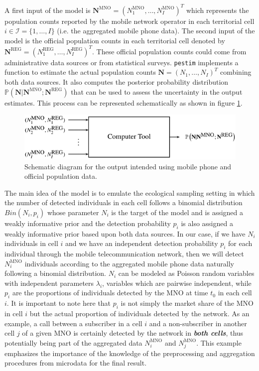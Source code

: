 \documentclass[12pt, a4paper]{article}
\begin{document}
A first input of the model is 
$\mathbf{N}^{\textrm{MNO}}=(N_{1}^{\textrm{MNO}}, \dots, N_{I}^{\textrm{MNO}})^{T}$ which 
represents the population counts reported by the mobile network operator in 
each territorial cell $i\in\mathcal{I}=\{1,\dots,I\}$ (i.e. the aggregated mobile phone data). 
The second input of the model is the official population counts in each territorial cell denoted by 
$\mathbf{N}^{\textrm{REG}}=(N_{1}^{\textrm{REG}}, \dots, N_{I}^{\textrm{REG}})^{T}$. 
These official population counts could come from administrative data sources or from statistical surveys.
\texttt{pestim} implements a function to estimate the actual population 
counts $\mathbf{N}=(N_{1}, \dots, N_{I})^{T}$ combining both data sources. 
It also computes the posterior probability distribution 
$\mathbb{P}\left(\mathbf{N}|\mathbf{N}^{\textrm{MNO}};\mathbf{N}^{\textrm{REG}}\right)$ 
that can be used to assess the uncertainty in the output estimates.
This process can be represented schematically as shown in figure \ref{Tool}.


\begin{figure}[htbp]
\centering
\includegraphics[scale=0.75]{Tool.png}
\caption{Schematic diagram for the output intended using mobile phone and official population data.}
\label{Tool} 
\end{figure}

The main idea of the model is to emulate the ecological sampling setting in which 
the number of detected individuals in each cell follows a binomial distribution $Bin(N_{i}, p_{i})$ 
whose parameter $N_{i}$ is the target of the model and is assigned a weakly informative prior 
and the detection probability $p_{i}$ is also assigned a weakly informative prior based 
upon both data sources. In our case, if we have $N_{i}$ individuals in cell $i$ and 
we have an independent detection probability $p_{i}$ for each individual through 
the mobile telecommunication network, then we will detect $N_{i}^{\textrm{MNO}}$ 
individuals according to the aggregated mobile phone data naturally following a binomial 
distribution. $N_{i}$  can be modeled as Poisson random variables with independent 
parameters $\lambda_{i}$, variables which are pairwise independent, while $p_{i}$ are 
the proportions of individuals detected by the MNO at time $t_{0}$ in each cell $i$. 
It is important to note here that $p_{i}$ is not simply the market share of the MNO in 
cell $i$ but the actual proportion of individuals detected by the network. As an 
example, a call between a subscriber in a cell $i$ and a non-subscriber in another 
cell $j$ of a given MNO is certainly detected by the network in \emph{\textbf{both cells}}, 
thus potentially being part of the aggregated data $N_{i}^{\textrm{MNO}}$ and $N_{j}^{\textrm{MNO}}$. 
This example emphasizes the importance  of the knowledge of the preprocessing and aggregation 
procedures from microdata for the final result.
\end{document}
